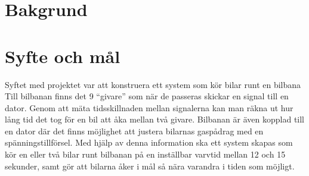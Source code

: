 \section{Bakgrund}


\section{Syfte och mål}
Syftet med projektet var att konstruera ett system som kör bilar runt en bilbana
Till bilbanan finns det 9 ``givare'' som när
de passeras skickar en signal till en dator. Genom att mäta tidsskillnaden
mellan signalerna kan man räkna ut hur lång tid det tog för en bil att åka
mellan två givare. Bilbanan är även kopplad till en dator där det finns
möjlighet att justera bilarnas gaspådrag med en spänningstillförsel. Med hjälp
av denna information ska ett system skapas som kör en eller två bilar runt
bilbanan på en inställbar varvtid mellan 12 och 15 sekunder, samt gör att
bilarna åker i mål så nära varandra i tiden som möjligt.
